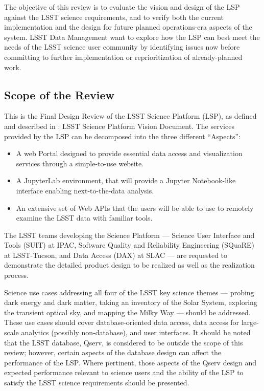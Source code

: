 \documentclass[DM,lsstdraft,STS,toc]{lsstdoc}
\begin{document}
The objective of this review is to evaluate the vision and design of the LSP against the LSST science requirements, and to verify both the current implementation
and the design for future planned operations-era aspects of the system.  LSST Data Management want to explore how the LSP can best meet the needs of the LSST science user community by
identifying issues now before committing to further implementation or reprioritization of already-planned work.


\subsection{Scope of the Review}
\label{sec:scope}
This is the Final Design Review of the LSST Science Platform (LSP), as defined and described in : LSST Science Platform Vision Document.
The services provided by the LSP can be decomposed into the three different ``Aspects'':
\begin{itemize}
\item A web Portal designed to provide essential data access and visualization services through a simple-to-use website.
\item A JupyterLab environment, that will provide a Jupyter Notebook-like interface enabling next-to-the-data analysis.
\item An extensive set of Web APIs that the users will be able to use to remotely examine the LSST data with familiar tools. 
\end{itemize}

The LSST teams developing the Science Platform --- Science User Interface and Tools (SUIT) at IPAC, 
Software Quality and Reliability Engineering (SQuaRE) at LSST-Tucson, and Data Access (DAX) at SLAC --- are
requested to demonstrate the detailed product design to be realized as well as the realization process.

Science use cases addressing all four of the LSST key science themes --- probing dark energy and dark matter,
taking an inventory of the Solar System, exploring the transient optical sky, and mapping the Milky Way --- should be addressed.
These use cases should cover database-oriented data access, data access for large-scale analytics (possibly non-database), and user interfaces. 
It should be noted that the LSST database, Qserv, is considered to be outside the scope of this review; however, certain aspects of the database design can affect the performance of the LSP. Where pertinent, those aspects of the Qserv design and expected performance relevant to science users and the ability of the LSP to satisfy the LSST science requirements should be presented.
\end{document}
